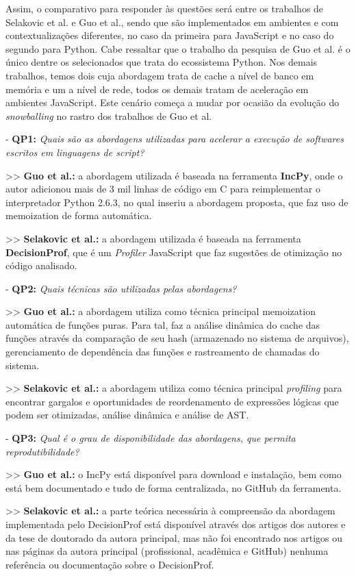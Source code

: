 \documentclass[sigconf]{acmart}
\begin{document}
Assim, o comparativo para responder às questões será entre os trabalhos de Selakovic et al. e Guo et al., sendo que são implementados em ambientes e com contextualizações diferentes, no caso da primeira para JavaScript e no caso do segundo para Python. Cabe ressaltar que o trabalho da pesquisa de Guo et al. é o único dentre os selecionados que trata do ecossistema Python. Nos demais trabalhos, temos dois cuja abordagem trata de cache a nível de banco em memória e um a nível de rede, todos os demais tratam de aceleração em ambientes JavaScript. Este cenário começa a mudar por ocasião da evolução do \textit{snowballing} no rastro dos trabalhos de Guo et al.

- \textbf{QP1:} {\textit{Quais são as abordagens utilizadas para acelerar a execução de softwares escritos em linguagens de script?}}

>> \textbf{Guo et al.:} a abordagem utilizada é baseada na ferramenta \textbf{IncPy}, onde o autor adicionou mais de 3 mil linhas de código em C para reimplementar o interpretador Python 2.6.3, no qual inseriu a abordagem proposta, que faz uso de memoization de forma automática.

>> \textbf{Selakovic et al.:} a abordagem utilizada é baseada na ferramenta \textbf{DecisionProf}, que é um \textit{Profiler} JavaScript que faz sugestões de otimização no código analisado.

- \textbf{QP2:} {\textit{Quais técnicas são utilizadas pelas abordagens?}}

>> \textbf{Guo et al.:} a abordagem utiliza como técnica principal memoization automática de funções puras. Para tal, faz a análise dinâmica do cache das funções através da comparação de seu hash (armazenado no sistema de arquivos), gerenciamento de dependência das funções e rastreamento de chamadas do sistema.

>> \textbf{Selakovic et al.:} a abordagem utiliza como técnica principal \textit{profiling}  para encontrar gargalos e oportunidades de reordenamento de expressões lógicas que podem ser otimizadas, análise dinâmica e análise de AST.

- \textbf{QP3:} {\textit{Qual é o grau de disponibilidade das abordagens, que permita reprodutibilidade?}}

>> \textbf{Guo et al.:} o IncPy está disponível para download e instalação, bem como está bem documentado e tudo de forma centralizada, no GitHub da ferramenta.

>> \textbf{Selakovic et al.:} a parte teórica necessária à compreensão da abordagem implementada pelo DecisionProf está disponível através dos artigos dos autores e da tese de doutorado da autora principal, mas não foi encontrado nos artigos ou nas páginas da autora principal (profissional, acadêmica e GitHub) nenhuma referência ou documentação sobre o DecisionProf.
\end{document}
